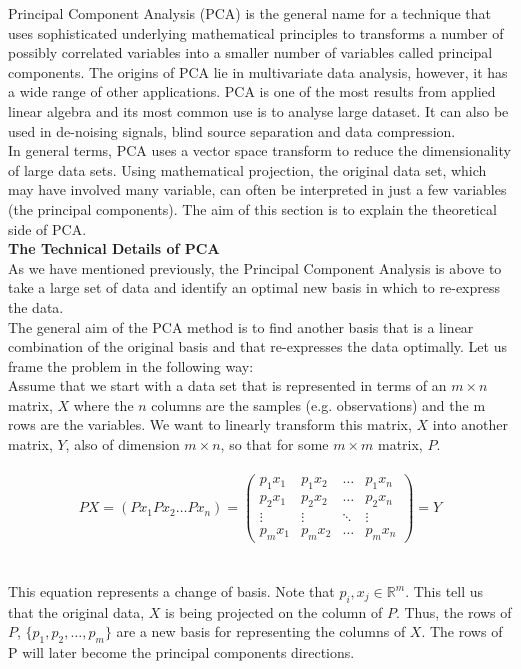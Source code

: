 Principal Component Analysis (PCA) is the general name for a technique that uses sophisticated underlying mathematical principles to transforms a number of possibly correlated variables into a smaller number of variables called principal components. The origins of PCA lie in multivariate data analysis, however, it has a wide range of other applications. PCA is one of the most results from applied linear algebra \cite{cite9} and its most common use is to analyse large dataset. It can also be used in de-noising signals, blind source separation and data compression.\\

In general terms, PCA uses a vector space transform to reduce the dimensionality of large data sets. Using mathematical projection, the original data set, which may have involved many variable, can often be interpreted in just a few variables (the principal components). The aim of this section is to explain the theoretical side of PCA.\\

\textbf{\normalsize{The Technical Details of PCA}}\\

As we have mentioned previously, the Principal Component Analysis is above to take a large set of data and identify an optimal new basis in which to re-express the data. \\

The general aim of the PCA method is to find another basis that is a linear combination of the original basis and that re-expresses the data optimally. Let us frame the problem in the following way:\\

Assume that we start with a data set that is represented in terms of an $m \times n$ matrix, $X$ where the $n$ columns are the samples (e.g. observations) and the m rows are the variables. We want to linearly transform this matrix, $X$ into another matrix, $Y$, also of dimension $m \times n$, so that for some $m \times m$ matrix, $P$.\\ 
~\\
\begin{equation*}
\label{eq1}
PX = (Px_{1} Px_{2} \ldots Px_{n})
=
\begin{pmatrix}
    p_{1}x_{1} & p_{1}x_{2}  & \dots  & p_{1}x_{n} \\
    p_{2}x_{1} & p_{2}x_{2}  & \dots  & p_{2}x_{n} \\
    \vdots & \vdots  & \ddots & \vdots \\
    p_{m}x_{1} & p_{m}x_{2}  & \dots  & p_{m}x_{n}
\end{pmatrix}
=
Y
\end{equation*}
~\\ ~\\ 
This equation represents a change of basis. Note that $p_{i},x_{j} \in  \mathbb{R}^{m}$. This tell us that the original data, $X$ is being projected on the column of $P$. Thus, the rows of $P$, $\{ p_{1},p_{2},\ldots,p_{m} \}$ are a new basis for representing the columns of $X$. The rows of P will later become the principal components directions.\\

